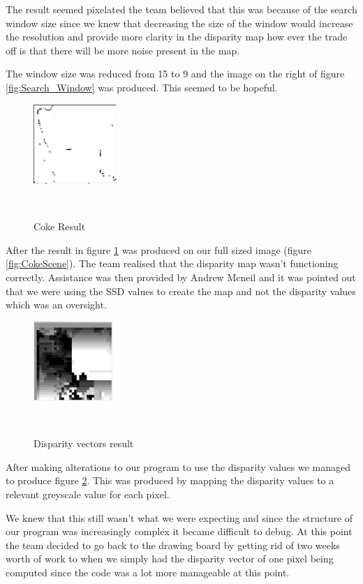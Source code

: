 \documentclass[twocolumn]{article}
\begin{document}
The result seemed pixelated the team believed that this was because of the search window size since we knew that decreasing the size of the window would increase the resolution and provide more clarity in the disparity map how ever the trade off is that there will be more noise present in the map. 

The window size was reduced from 15 to 9 and the image on the right of figure \ref{fig:Search_Window} was produced. This seemed to be hopeful.

\begin{figure}[H]
\centering
  \includegraphics[height=30mm]{Figures/Coke_Result}
    \caption{Coke Result}~\label{fig:Coke_Result}
\end{figure} 

After the result in figure \ref{fig:Coke_Result} was produced on our full sized image (figure \ref{fig:CokeScene}). The team realised that the disparity map wasn't functioning correctly. Assistance was then provided by Andrew Mcneil and it was pointed out that we were using the SSD values to create the map and not the disparity values which was an oversight.  

 \begin{figure}[H]
\centering
  \includegraphics[height=30mm]{Figures/Disp_Vectors_1}
    \caption{Disparity vectors result}~\label{fig:Disp_Vectors_1}
\end{figure} 

After making alterations to our program to use the disparity values we managed to produce figure \ref{fig:Disp_Vectors_1}. This was produced by mapping the disparity values to a relevant greyscale value for each pixel. 

We knew that this still wasn't what we were expecting and since the structure of our program was increasingly complex it became difficult to debug. At this point the team decided to go back to the drawing board by getting rid of two weeks worth of work to when we simply had the disparity vector of one pixel being computed since the code was a lot more manageable at this point. 
\end{document}
